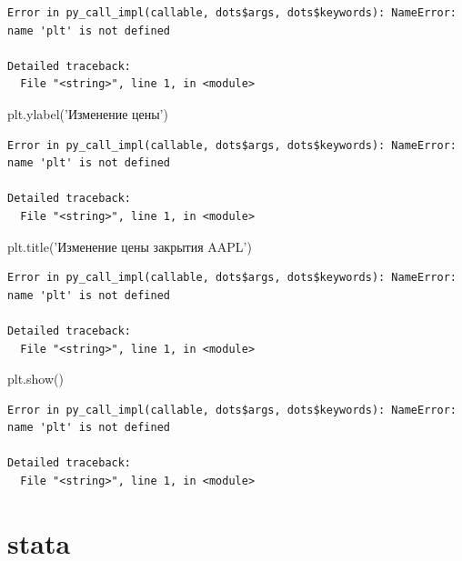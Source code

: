 \documentclass[]{book}
\newenvironment{Shaded}{\begin{snugshade}}{\end{snugshade}}
\newcommand{\NormalTok}[1]{#1}
\newcommand{\StringTok}[1]{\textcolor[rgb]{0.31,0.60,0.02}{#1}}
\begin{document}
\begin{verbatim}
Error in py_call_impl(callable, dots$args, dots$keywords): NameError: name 'plt' is not defined

Detailed traceback: 
  File "<string>", line 1, in <module>
\end{verbatim}

\begin{Shaded}
\begin{Highlighting}[]
\NormalTok{plt.ylabel(}\StringTok{'Изменение цены'}\NormalTok{)}
\end{Highlighting}
\end{Shaded}

\begin{verbatim}
Error in py_call_impl(callable, dots$args, dots$keywords): NameError: name 'plt' is not defined

Detailed traceback: 
  File "<string>", line 1, in <module>
\end{verbatim}

\begin{Shaded}
\begin{Highlighting}[]
\NormalTok{plt.title(}\StringTok{'Изменение цены закрытия AAPL'}\NormalTok{)}
\end{Highlighting}
\end{Shaded}

\begin{verbatim}
Error in py_call_impl(callable, dots$args, dots$keywords): NameError: name 'plt' is not defined

Detailed traceback: 
  File "<string>", line 1, in <module>
\end{verbatim}

\begin{Shaded}
\begin{Highlighting}[]
\NormalTok{plt.show()}
\end{Highlighting}
\end{Shaded}

\begin{verbatim}
Error in py_call_impl(callable, dots$args, dots$keywords): NameError: name 'plt' is not defined

Detailed traceback: 
  File "<string>", line 1, in <module>
\end{verbatim}

\hypertarget{stata-2}{%
\section{stata}\label{stata-2}}
\end{document}
